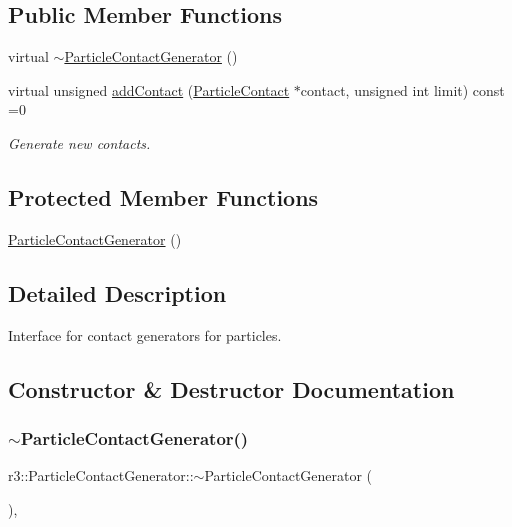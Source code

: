 \subsection*{Public Member Functions}
\begin{DoxyCompactItemize}
\item 
virtual \mbox{\hyperlink{classr3_1_1_particle_contact_generator_af258aa3e7d7fb8e9c9ca7eb545d27738}{$\sim$\+Particle\+Contact\+Generator}} ()
\item 
virtual unsigned \mbox{\hyperlink{classr3_1_1_particle_contact_generator_a3c9c99fb97a4431f0ddf300b30167d03}{add\+Contact}} (\mbox{\hyperlink{classr3_1_1_particle_contact}{Particle\+Contact}} $\ast$contact, unsigned int limit) const =0
\begin{DoxyCompactList}\small\item\em Generate new contacts. \end{DoxyCompactList}\end{DoxyCompactItemize}
\subsection*{Protected Member Functions}
\begin{DoxyCompactItemize}
\item 
\mbox{\hyperlink{classr3_1_1_particle_contact_generator_a3cfeb03fe6fb6a82a64746c0dd9b89f2}{Particle\+Contact\+Generator}} ()
\end{DoxyCompactItemize}


\subsection{Detailed Description}
Interface for contact generators for particles. 

\subsection{Constructor \& Destructor Documentation}
\mbox{\label{classr3_1_1_particle_contact_generator_af258aa3e7d7fb8e9c9ca7eb545d27738}} 
\subsubsection{\texorpdfstring{$\sim$\+Particle\+Contact\+Generator()}{~ParticleContactGenerator()}}
{\footnotesize\ttfamily r3\+::\+Particle\+Contact\+Generator\+::$\sim$\+Particle\+Contact\+Generator (\begin{DoxyParamCaption}{ }\end{DoxyParamCaption})\hspace{0.3cm}{\ttfamily [virtual]}, {\ttfamily [default]}}


